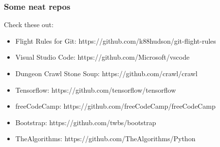 \documentclass[unknownkeysallowed]{beamer}
\begin{document}
\begin{frame}
    \frametitle{Some neat repos}
    Check these out:
    \begin{itemize}
        \item{Flight Rules for Git: https://github.com/k88hudson/git-flight-rules}
        \item{Visual Studio Code: https://github.com/Microsoft/vscode}
        \item{Dungeon Crawl Stone Soup: https://github.com/crawl/crawl}
        \item{Tensorflow: https://github.com/tensorflow/tensorflow}
        \item{freeCodeCamp: https://github.com/freeCodeCamp/freeCodeCamp}
        \item{Bootstrap: https://github.com/twbs/bootstrap}
        \item{TheAlgorithms: https://github.com/TheAlgorithms/Python}
    \end{itemize}
    \vspace{1cm} %
\end{frame}
\end{document}
